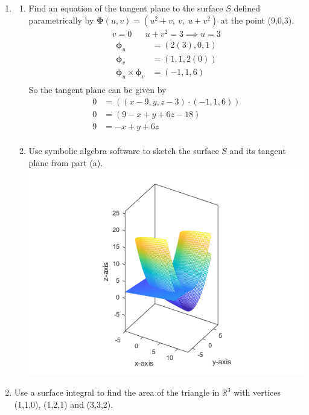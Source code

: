 \documentclass{article}
\begin{document}
\thispagestyle{fancy}

\begin{enumerate}
    \item
    \begin{enumerate}
        \item Find an equation of the tangent plane to the surface $S$ defined parametrically by $\boldsymbol \Phi(u, v) = (u^2 + v,\ v,\ u+v^2)$ at the point (9,0,3).
        \begin{align*}
            &v = 0 & &u + v^2 = 3 \implies u = 3&
        \end{align*}
        \begin{align*}
            \boldsymbol \phi_u &= (2(3), 0, 1) \\
            \boldsymbol \phi_v &= (1,1,2(0)) \\
            \boldsymbol \phi_u \times \boldsymbol \phi_v &= (-1,1,6) \\
        \end{align*}
        So the tangent plane can be given by
        \begin{align*}
            0 &= ((x - 9, y, z - 3) \cdot (-1,1,6)) \\
            0 &= (9 - x + y + 6z - 18) \\
            9 &= -x + y + 6z \\
        \end{align*}
        \item Use symbolic algebra software to sketch the surface $S$ and its tangent plane from part (a).
        \includegraphics[width=\textwidth]{b42-a7-1b}
    \end{enumerate}
    \newpage
    \item Use a surface integral to find the area of the triangle in $\mathbb{R}^3$ with vertices (1,1,0), (1,2,1) and (3,3,2).
    

\end{enumerate}
\end{document}
